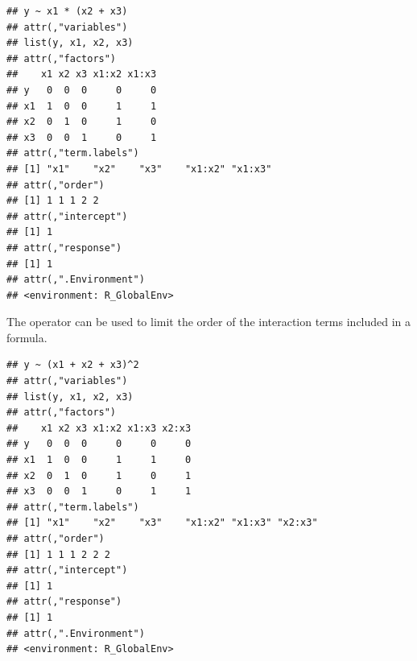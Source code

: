 \documentclass[krantz2]{krantz}\usepackage{knitr}%
\begin{document}
\begin{knitrout}\footnotesize
{}\color{fgcolor}\begin{kframe}
\begin{alltt}
 \hlopt{~}  \hlopt{*}  \hlopt{+} 
\end{alltt}
\begin{verbatim}
## y ~ x1 * (x2 + x3)
## attr(,"variables")
## list(y, x1, x2, x3)
## attr(,"factors")
##    x1 x2 x3 x1:x2 x1:x3
## y   0  0  0     0     0
## x1  1  0  0     1     1
## x2  0  1  0     1     0
## x3  0  0  1     0     1
## attr(,"term.labels")
## [1] "x1"    "x2"    "x3"    "x1:x2" "x1:x3"
## attr(,"order")
## [1] 1 1 1 2 2
## attr(,"intercept")
## [1] 1
## attr(,"response")
## [1] 1
## attr(,".Environment")
## <environment: R_GlobalEnv>
\end{verbatim}
\end{kframe}
\end{knitrout}

The \code{\textasciicircum{}} operator can be used to limit the order of the interaction terms included in a formula.

\begin{knitrout}\footnotesize
{}\color{fgcolor}\begin{kframe}
\begin{alltt}
 \hlopt{~}  \hlopt{+}  \hlopt{+} \hlopt{^}
 \hlopt{~}  \hlopt{+}  \hlopt{+}  \hlopt{+} \hlopt{:} \hlopt{+} \hlopt{:} \hlopt{+} \hlopt{:}
\end{alltt}
\end{kframe}
\end{knitrout}

\begin{knitrout}\footnotesize
{}\color{fgcolor}\begin{kframe}
\begin{alltt}
 \hlopt{~}  \hlopt{+}  \hlopt{+} \hlopt{^}\hlstd{)}
\end{alltt}
\begin{verbatim}
## y ~ (x1 + x2 + x3)^2
## attr(,"variables")
## list(y, x1, x2, x3)
## attr(,"factors")
##    x1 x2 x3 x1:x2 x1:x3 x2:x3
## y   0  0  0     0     0     0
## x1  1  0  0     1     1     0
## x2  0  1  0     1     0     1
## x3  0  0  1     0     1     1
## attr(,"term.labels")
## [1] "x1"    "x2"    "x3"    "x1:x2" "x1:x3" "x2:x3"
## attr(,"order")
## [1] 1 1 1 2 2 2
## attr(,"intercept")
## [1] 1
## attr(,"response")
## [1] 1
## attr(,".Environment")
## <environment: R_GlobalEnv>
\end{verbatim}
\end{kframe}
\end{knitrout}
\end{document}
